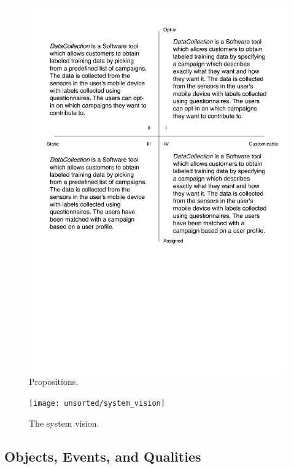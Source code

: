\begin{figure}[!htbp]
	\centering
	\includegraphics[width=\textwidth]{graphic/problem_analysis/vision/propositions.pdf}
	\caption{Propositions.}
	\label{fig:propositions}
\end{figure}
\FloatBarrier

\begin{figure}[!htbp]
    \centering
    \texttt{[image: unsorted/system\_vision]}
    \caption{The system vision.}
    \label{fig:system_vision}
\end{figure}
\FloatBarrier

\subsection{Objects, Events, and Qualities}
\label{sub:objects_events_and_qualities}


